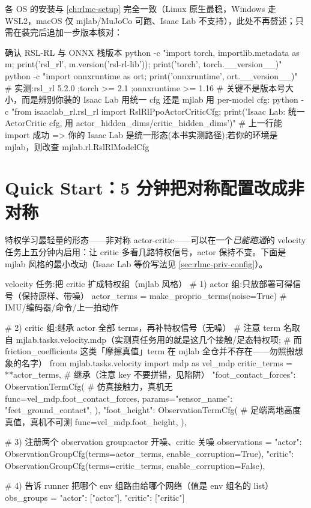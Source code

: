 各 OS 的安装与 \cref{ch:rlmc-setup} 完全一致（Linux 原生最稳，Windows 走 WSL2，macOS 仅 mjlab/MuJoCo 可跑、Isaac Lab 不支持），此处不再赘述；只需在装完后追加一步版本核对：

\begin{codebox}[bash]{确认 RSL-RL 与 ONNX 栈版本}
python -c "import torch, importlib.metadata as m; print('rsl_rl', m.version('rsl-rl-lib')); print('torch', torch.__version__)"
python -c "import onnxruntime as ort; print('onnxruntime', ort.__version__)"
# 实测:rsl_rl 5.2.0 ;torch >= 2.1 ;onnxruntime >= 1.16
# 关键不是版本号大小，而是辨别你装的 Isaac Lab 用统一 cfg 还是 mjlab 用 per-model cfg:
python -c "from isaaclab_rl.rsl_rl import RslRlPpoActorCriticCfg; print('Isaac Lab: 统一 ActorCritic cfg, 用 actor_hidden_dims/critic_hidden_dims')"
# 上一行能 import 成功 => 你的 Isaac Lab 是统一形态(本书实测路径);若你的环境是 mjlab，则改查 mjlab.rl.RslRlModelCfg
\end{codebox}

\section*{Quick Start：5 分钟把对称配置改成非对称}
\label{sec:rlmc-priv-quickstart}

特权学习最轻量的形态——非对称 actor-critic——可以在一个\emph{已能跑通}的 velocity 任务上五分钟内启用：让 critic 多看几路特权信号，actor 保持不变。下面是 mjlab 风格的最小改动（Isaac Lab 等价写法见 \cref{sec:rlmc-priv-config}）。

\begin{codebox}[Python]{velocity 任务:把 critic 扩成特权组（mjlab 风格）}
# 1) actor 组:只放部署可得信号（保持原样、带噪）
actor_terms = make_proprio_terms(noise=True)   # IMU/编码器/命令/上一拍动作

# 2) critic 组:继承 actor 全部 terms，再补特权信号（无噪）
# 注意 term 名取自 mjlab.tasks.velocity.mdp（实测真任务用的就是这几个接触/足态特权项;
# 而 friction_coefficients 这类「摩擦真值」term 在 mjlab 全仓并不存在——勿照搬想象的名字）
from mjlab.tasks.velocity import mdp as vel_mdp
critic_terms = {
    **actor_terms,                              # 继承（注意 key 不要拼错，见陷阱）
    "foot_contact_forces": ObservationTermCfg(  # 仿真接触力，真机无
        func=vel_mdp.foot_contact_forces,
        params={"sensor_name": "feet_ground_contact"},
    ),
    "foot_height": ObservationTermCfg(          # 足端离地高度真值，真机不可测
        func=vel_mdp.foot_height,
    ),
}

# 3) 注册两个 observation group:actor 开噪、critic 关噪
observations = {
    "actor":  ObservationGroupCfg(terms=actor_terms,  enable_corruption=True),
    "critic": ObservationGroupCfg(terms=critic_terms, enable_corruption=False),
}

# 4) 告诉 runner 把哪个 env 组路由给哪个网络（值是 env 组名的 list）
obs_groups = {"actor": ["actor"], "critic": ["critic"]}
\end{codebox}

